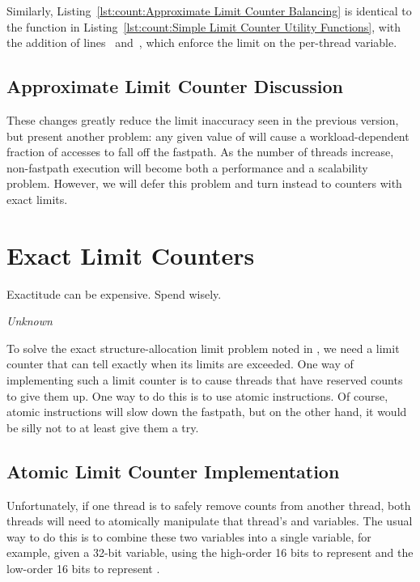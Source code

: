 \begin{fcvref}
Similarly,
Listing~\ref{lst:count:Approximate Limit Counter Balancing}
is identical to the  function in
Listing~\ref{lst:count:Simple Limit Counter Utility Functions},
with the addition of
lines~ and~, which enforce the
 limit on the per-thread  variable.
\end{fcvref}

\subsection{Approximate Limit Counter Discussion}

These changes greatly reduce the limit inaccuracy seen in the previous version,
but present another problem: any given value of 
will cause a workload-dependent fraction of accesses to fall off the
fastpath.
As the number of threads increase, non-fastpath execution will become both
a performance and a scalability problem.
However, we will defer this problem and turn instead to counters
with exact limits.

\section{Exact Limit Counters}
\label{sec:count:Exact Limit Counters}
%
\epigraph{Exactitude can be expensive.  Spend wisely.}{\emph{Unknown}}

To solve the exact structure-allocation limit problem noted in
\QuickQuizRef{\QcountQexactcnt},
we need a limit counter that can tell exactly when its limits are
exceeded.
One way of implementing such a limit counter is to
cause threads that have reserved counts to give them up.
One way to do this is to use atomic instructions.
Of course, atomic instructions will slow down the fastpath, but on the
other hand, it would be silly not to at least give them a try.

\subsection{Atomic Limit Counter Implementation}
\label{sec:count:Atomic Limit Counter Implementation}

Unfortunately,
if one thread is to safely remove counts from another thread,
both threads will need to atomically manipulate that thread's
 and  variables.
The usual way to do this is to combine these two variables into a
single variable,
for example, given a 32-bit variable, using the high-order 16 bits to
represent  and the low-order 16 bits to represent
.

